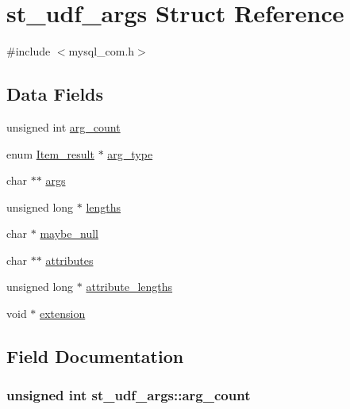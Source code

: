 \hypertarget{structst__udf__args}{}\section{st\+\_\+udf\+\_\+args Struct Reference}
\label{structst__udf__args}


{\ttfamily \#include $<$mysql\+\_\+com.\+h$>$}

\subsection*{Data Fields}
\begin{DoxyCompactItemize}
\item 
unsigned int \hyperlink{structst__udf__args_aae7bad81ac1c687adc79bc86d5779af5}{arg\+\_\+count}
\item 
enum \hyperlink{mysql__com_8h_ac852cc9149359bbfde83ad6ff646fd62}{Item\+\_\+result} $\ast$ \hyperlink{structst__udf__args_ab73c43bb4892710871107d3ba1a574a4}{arg\+\_\+type}
\item 
char $\ast$$\ast$ \hyperlink{structst__udf__args_a46db15869b94df358058161746b0a980}{args}
\item 
unsigned long $\ast$ \hyperlink{structst__udf__args_a33da3ea6885ea39c404e2a6746d16ae2}{lengths}
\item 
char $\ast$ \hyperlink{structst__udf__args_a9654fdb453511ebf6044a0fcb1bb72f0}{maybe\+\_\+null}
\item 
char $\ast$$\ast$ \hyperlink{structst__udf__args_a813cc3fd4e25b055897c644e120ad917}{attributes}
\item 
unsigned long $\ast$ \hyperlink{structst__udf__args_abce70fbf29da34990797ddd822dcf197}{attribute\+\_\+lengths}
\item 
void $\ast$ \hyperlink{structst__udf__args_a8ab6a5e6f5652f4e7c14d0d88f8a2e66}{extension}
\end{DoxyCompactItemize}


\subsection{Field Documentation}
\hypertarget{structst__udf__args_aae7bad81ac1c687adc79bc86d5779af5}{}
\subsubsection[{arg\+\_\+count}]{\setlength{\rightskip}{0pt plus 5cm}unsigned int st\+\_\+udf\+\_\+args\+::arg\+\_\+count}\label{structst__udf__args_aae7bad81ac1c687adc79bc86d5779af5}
\hypertarget{structst__udf__args_ab73c43bb4892710871107d3ba1a574a4}{}
